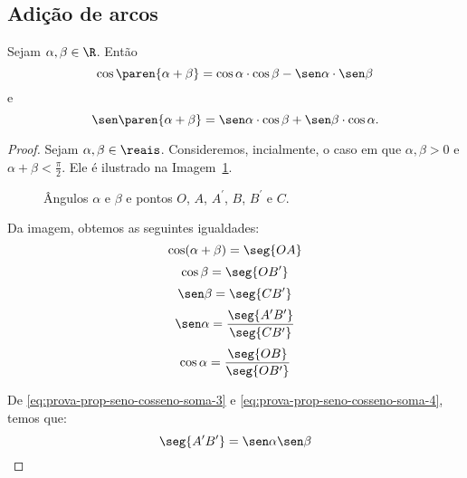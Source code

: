 \subsection{Adição de arcos}

\begin{proposition}
\label{prop:seno-e-cosseno-da-soma}
    Sejam $\alpha, \beta \in \R$. Então
$$\cos \paren{\alpha + \beta} = \cos \alpha \cdot \cos \beta - \sen
\alpha \cdot \sen \beta$$ e
$$\sen \paren{\alpha + \beta} = \sen \alpha \cdot \cos \beta +\sen \beta \cdot
\cos \alpha.$$
\end{proposition}

\begin{proof}
    Sejam $\alpha, \beta \in \reais$. Consideremos, incialmente, o caso em que 
    $\alpha,\beta>0$ e $\alpha+\beta < \frac{\pi}{2}$. Ele é ilustrado na Imagem~\ref{img:prova-seno-e-cosseno-da-soma}.
    \begin{figure}[H]
        \centering
        \caption{Ângulos $\alpha$ e $\beta$ e pontos $O$, $A$, $A^\prime$, $B$, $B^\prime$ e $C$.}
        \label{img:prova-seno-e-cosseno-da-soma}
    \end{figure}
    Da imagem, obtemos as seguintes igualdades:
    \begin{equation*}
        \cos(\alpha+\beta) = \seg{OA}
    \end{equation*}
    \begin{equation}
    \label{eq:prova-prop-seno-cosseno-soma-2}
        \cos\beta = \seg{OB^{\prime}}
    \end{equation}
    \begin{equation}
    \label{eq:prova-prop-seno-cosseno-soma-3}
        \sen\beta = \seg{CB^{\prime}}
    \end{equation} 
    \begin{equation}
    \label{eq:prova-prop-seno-cosseno-soma-4}
        \sen\alpha = \frac{\seg{A^{\prime}B^{\prime}}}{\seg{CB^{\prime}}}
    \end{equation}
    \begin{equation}
    \label{eq:prova-prop-seno-cosseno-soma-5}
        \cos\alpha = \frac{\seg{OB}}{\seg{OB^{\prime}}}
    \end{equation}

    De \ref{eq:prova-prop-seno-cosseno-soma-3} e \ref{eq:prova-prop-seno-cosseno-soma-4}, temos que:
    \begin{equation}
    \label{eq:prova-prop-seno-cosseno-soma-6}
        \seg{A^{\prime} B^{\prime}} = \sen \alpha \sen \beta
    \end{equation}


\end{proof}
